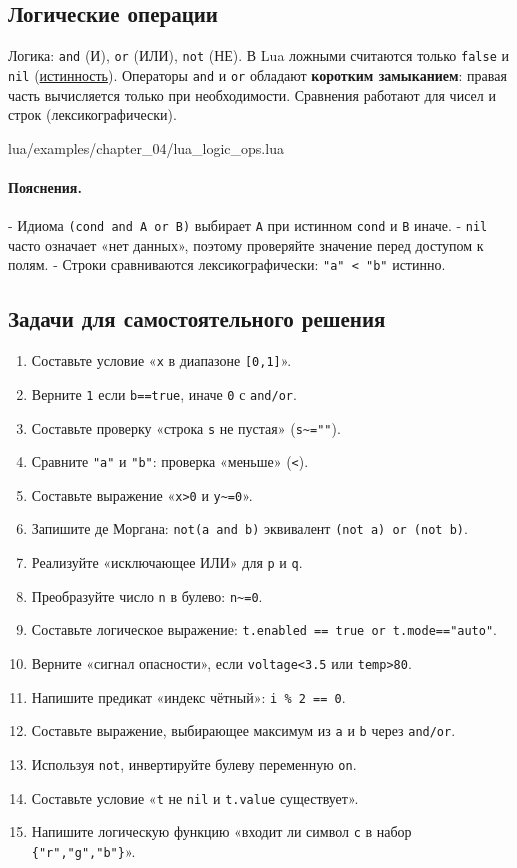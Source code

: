 \subsection{Логические операции}
Логика: \verb|and| (И), \verb|or| (ИЛИ), \verb|not| (НЕ). В Lua ложными считаются только \verb|false| и \verb|nil| (\hyperlink{term:truthiness}{истинность}). Операторы \verb|and| и \verb|or| обладают \textbf{коротким замыканием}: правая часть вычисляется только при необходимости. Сравнения работают для чисел и строк (лексикографически).
\begin{codefile}{lua/examples/chapter_04/lua_logic_ops.lua}
\end{codefile}
\paragraph{Пояснения.}
- Идиома \verb|(cond and A or B)| выбирает \verb|A| при истинном \verb|cond| и \verb|B| иначе.
- \verb|nil| часто означает «нет данных», поэтому проверяйте значение перед доступом к полям.
- Строки сравниваются лексикографически: \verb|"a" < "b"| истинно.
\subsection*{Задачи для самостоятельного решения}
\begin{enumerate}
  \item Составьте условие «\verb|x| в диапазоне \verb|[0,1]|».
  \item Верните \verb|1| если \verb|b==true|, иначе \verb|0| с \verb|and/or|.
  \item Составьте проверку «строка \verb|s| не пустая» (\verb|s~=""|).
  \item Сравните \verb|"a"| и \verb|"b"|: проверка «меньше» (\verb|<|).
  \item Составьте выражение «\verb|x>0| и \verb|y~=0|».
  \item Запишите де Моргана: \verb|not(a and b)| эквивалент \verb|(not a) or (not b)|.
  \item Реализуйте «исключающее ИЛИ» для \verb|p| и \verb|q|.
  \item Преобразуйте число \verb|n| в булево: \verb|n~=0|.
  \item Составьте логическое выражение: \verb|t.enabled == true or t.mode=="auto"|.
  \item Верните «сигнал опасности», если \verb|voltage<3.5| или \verb|temp>80|.
  \item Напишите предикат «индекс чётный»: \verb|i % 2 == 0|.
  \item Составьте выражение, выбирающее максимум из \verb|a| и \verb|b| через \verb|and/or|.
  \item Используя \verb|not|, инвертируйте булеву переменную \verb|on|.
  \item Составьте условие «\verb|t| не \verb|nil| и \verb|t.value| существует».
  \item Напишите логическую функцию «входит ли символ \verb|c| в набор \verb|{"r","g","b"}|».
\end{enumerate}
